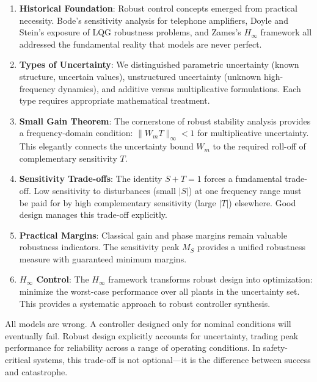 \begin{enumerate}
    \item \textbf{Historical Foundation}: Robust control concepts emerged from practical necessity. Bode's sensitivity analysis for telephone amplifiers, Doyle and Stein's exposure of LQG robustness problems, and Zames's $H_\infty$ framework all addressed the fundamental reality that models are never perfect.

    \item \textbf{Types of Uncertainty}: We distinguished parametric uncertainty (known structure, uncertain values), unstructured uncertainty (unknown high-frequency dynamics), and additive versus multiplicative formulations. Each type requires appropriate mathematical treatment.

    \item \textbf{Small Gain Theorem}: The cornerstone of robust stability analysis provides a frequency-domain condition: $\|W_m T\|_\infty < 1$ for multiplicative uncertainty. This elegantly connects the uncertainty bound $W_m$ to the required roll-off of complementary sensitivity $T$.

    \item \textbf{Sensitivity Trade-offs}: The identity $S + T = 1$ forces a fundamental trade-off. Low sensitivity to disturbances (small $|S|$) at one frequency range must be paid for by high complementary sensitivity (large $|T|$) elsewhere. Good design manages this trade-off explicitly.

    \item \textbf{Practical Margins}: Classical gain and phase margins remain valuable robustness indicators. The sensitivity peak $M_S$ provides a unified robustness measure with guaranteed minimum margins.

    \item \textbf{$H_\infty$ Control}: The $H_\infty$ framework transforms robust design into optimization: minimize the worst-case performance over all plants in the uncertainty set. This provides a systematic approach to robust controller synthesis.
\end{enumerate}

\begin{tcolorbox}[colback=yellow!10!white,colframe=orange!75!black,title=Key Takeaway,sharp corners]
All models are wrong. A controller designed only for nominal conditions will eventually fail. Robust design explicitly accounts for uncertainty, trading peak performance for reliability across a range of operating conditions. In safety-critical systems, this trade-off is not optional---it is the difference between success and catastrophe.
\end{tcolorbox}


